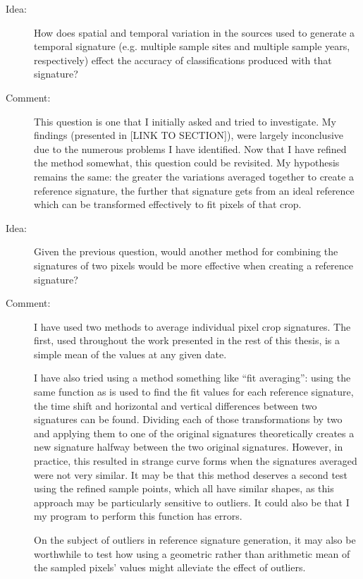 \begin{description}
\item[Idea:] How does spatial and temporal variation in the sources used to generate a temporal signature (e.g. multiple sample sites and multiple sample years, respectively) effect the accuracy of classifications produced with that signature?

\item[Comment:] This question is one that I initially asked and tried to investigate. My findings (presented in [LINK TO SECTION]), were largely inconclusive due to the numerous problems I have identified. Now that I have refined the method somewhat, this question could be revisited. My hypothesis remains the same: the greater the variations averaged together to create a reference signature, the further that signature gets from an ideal reference which can be transformed effectively to fit pixels of that crop.

\item[Idea:] Given the previous question, would another method for combining the signatures of two pixels would be more effective when creating a reference signature?

\item[Comment:] I have used two methods to average individual pixel crop signatures. The first, used throughout the work presented in the rest of this thesis, is a simple mean of the values at any given date.

I have also tried using a method something like “fit averaging”: using the same function as is used to find the fit values for each reference signature, the time shift and horizontal and vertical differences between two signatures can be found. Dividing each of those transformations by two and applying them to one of the original signatures theoretically creates a new signature halfway between the two original signatures. However, in practice, this resulted in strange curve forms when the signatures averaged were not very similar. It may be that this method deserves a second test using the refined sample points, which all have similar shapes, as this approach may be particularly sensitive to outliers. It could also be that I my program to perform this function has errors.

On the subject of outliers in reference signature generation, it may also be worthwhile to test how using a geometric rather than arithmetic mean of the sampled pixels’ values might alleviate the effect of outliers.
\end{description}

